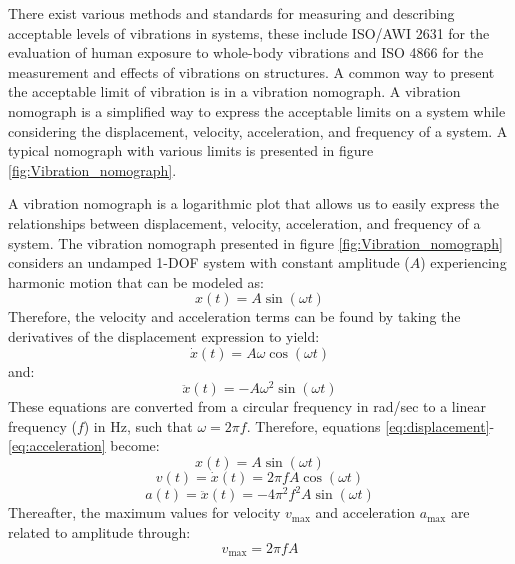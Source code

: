 \documentclass[12pt,letter]{article}
\begin{document}
There exist various methods and standards for measuring and describing acceptable levels of vibrations in systems, these include ISO/AWI 2631 for the evaluation of human exposure to whole-body vibrations and ISO 4866 for the measurement and effects of vibrations on structures. A common way to present the acceptable limit of vibration is in a vibration nomograph.  A vibration nomograph is a simplified way to express the acceptable limits on a system while considering the displacement, velocity, acceleration, and frequency of a system. A typical nomograph with various limits is presented in figure \ref{fig:Vibration_nomograph}. 

A vibration nomograph is a logarithmic plot that allows us to easily express the relationships between displacement, velocity, acceleration, and frequency of a system. The vibration nomograph presented in figure \ref{fig:Vibration_nomograph} considers an undamped 1-DOF system with constant amplitude ($A$) experiencing harmonic motion that can be modeled as:
\begin{equation}
    x(t) = A \sin(\omega t)
    \label{eq:displacement}
\end{equation}
Therefore, the velocity and acceleration terms can be found by taking the derivatives of the displacement expression to yield:
\begin{equation}
    \dot{x}(t) = A \omega \cos(\omega t)
\end{equation}
and:
\begin{equation}
    \ddot{x}(t) = -A\omega^2 \sin(\omega t)
    \label{eq:acceleration}
\end{equation}
These equations are converted from a circular frequency in rad/sec to a linear frequency ($f$) in Hz, such that $\omega = 2\pi f$. Therefore, equations \ref{eq:displacement}-\ref{eq:acceleration} become:
\begin{equation}
    x(t) = A \sin(\omega t)
\end{equation}
\begin{equation}
    v(t) =  \dot{x}(t) = 2\pi f A \cos(\omega t)
\end{equation}
\begin{equation}
    a(t) =  \ddot{x}(t) = -4\pi^2 f^2 A \sin(\omega t)
\end{equation}
Thereafter, the maximum values for velocity $v_\text{max}$ and acceleration $a_\text{max}$ are related to amplitude through:
\begin{equation}
    v_\text{max} = 2\pi f A 
    \label{eq:v_max}
\end{equation}
\end{document}
